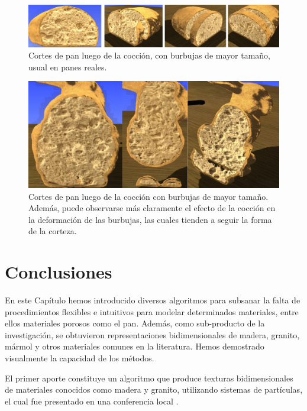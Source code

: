 \begin{figure}[!ht]
\begin{center}
\includegraphics[width=13cm]{figures/baked}
\caption[Cortes de pan luego de la cocción, con burbujas de mayor tamaño]{Cortes de pan luego de la cocción, con burbujas de mayor tamaño, usual en panes reales.}
\label{fg:bigalveoli}
\end{center}
\end{figure}

\begin{figure}[!ht]
\begin{center}
\includegraphics[width=13cm]{figures/bakedbunny}
\caption[Efecto de la cocción sobre el pan sintético.]{Cortes de pan luego de la cocción con burbujas de mayor tamaño. Además, puede observarse más claramente el efecto de la cocción en la deformación de las burbujas, las cuales tienden a seguir la forma de la corteza.}
\label{fg:bakedbunny}
\end{center}
\end{figure}

\section{Conclusiones}
En este Cap\'itulo hemos introducido diversos algoritmos para subsanar la falta de procedimientos flexibles e intuitivos para modelar determinados materiales, entre ellos materiales porosos como el pan. Además, como sub-producto de la investigación, se obtuvieron representaciones bidimensionales de madera, granito, mármol y otros materiales comunes en la literatura.
Hemos demostrado visualmente la capacidad de los métodos.

El primer aporte constituye un algoritmo que produce texturas bidimensionales de materiales conocidos como madera y granito, utilizando sistemas de partículas, el cual fue presentado en una conferencia local \cite{Baravalle2011}.

